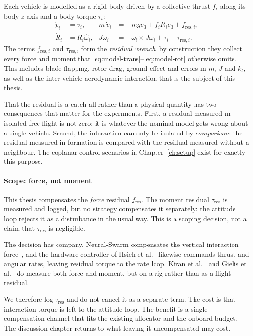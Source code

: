 Each vehicle is modelled as a rigid body driven by a collective thrust $f_i$ along its body
$z$-axis and a body torque $\tau_i$:
%
\begin{align}
  \dot{p}_i &= v_i, &
  m\,\dot{v}_i &= -m g e_3 + f_i R_i e_3 + f_{\mathrm{res},i}, \label{eq:model-trans}\\
  \dot{R}_i &= R_i \hat{\omega}_i, &
  J\dot{\omega}_i &= -\omega_i \times J\omega_i + \tau_i + \tau_{\mathrm{res},i}.
  \label{eq:model-rot}
\end{align}
%
The terms $f_{\mathrm{res},i}$ and $\tau_{\mathrm{res},i}$ form the \emph{residual wrench}: by
construction they collect every force and moment that \eqref{eq:model-trans}--\eqref{eq:model-rot}
otherwise omits. This includes blade flapping, rotor drag, ground effect and errors in $m$, $J$ and
$k_t$, as well as the inter-vehicle aerodynamic interaction that is the subject of this thesis.

That the residual is a catch-all rather than a physical quantity has two consequences that matter
for the experiments. First, a residual measured in isolated free flight is not zero; it is whatever
the nominal model gets wrong about a single vehicle. Second, the interaction can only be isolated
by \emph{comparison}: the residual measured in formation is compared with the residual measured
without a neighbour. The coplanar control scenarios in Chapter~\ref{ch:setup} exist for exactly
this purpose.

\paragraph{Scope: force, not moment}

This thesis compensates the \emph{force} residual $f_{\mathrm{res}}$. The moment residual
$\tau_{\mathrm{res}}$ is measured and logged, but no strategy compensates it separately: the
attitude loop rejects it as a disturbance in the usual way. This is a scoping decision, not a claim
that $\tau_{\mathrm{res}}$ is negligible.

The decision has company. Neural-Swarm compensates the vertical interaction
force~\cite{shi2020neuralswarm}, and the hardware controller of Hsieh et
al.~\cite{hsieh2026flatness} likewise commands thrust and angular rates, leaving residual torque to
the rate loop. Kiran et al.~\cite{kiran2025downwash} and Gielis et al.~\cite{gielis2023aggregate}
do measure both force and moment, but on a rig rather than as a flight residual.

We therefore log $\tau_{\mathrm{res}}$ and do not cancel it as a separate term. The cost is that
interaction torque is left to the attitude loop. The benefit is a single compensation channel that
fits the existing allocator and the onboard budget. The discussion chapter returns to what leaving
it uncompensated may cost.

